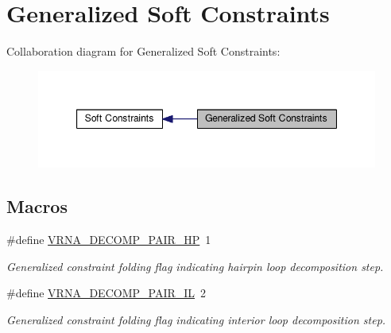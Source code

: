 \hypertarget{group__generalized__sc}{\section{Generalized Soft Constraints}
\label{group__generalized__sc}
}
Collaboration diagram for Generalized Soft Constraints\+:
\nopagebreak
\begin{figure}[H]
\begin{center}
\leavevmode
\includegraphics[width=347pt]{group__generalized__sc}
\end{center}
\end{figure}
\subsection*{Macros}
\begin{DoxyCompactItemize}
\item 
\hypertarget{group__generalized__sc_ga8bd41ebc8039378d242e4e8c273716a5}{\#define \hyperlink{group__generalized__sc_ga8bd41ebc8039378d242e4e8c273716a5}{V\+R\+N\+A\+\_\+\+D\+E\+C\+O\+M\+P\+\_\+\+P\+A\+I\+R\+\_\+\+H\+P}~1}\label{group__generalized__sc_ga8bd41ebc8039378d242e4e8c273716a5}

\begin{DoxyCompactList}\small\item\em Generalized constraint folding flag indicating hairpin loop decomposition step. \end{DoxyCompactList}\item 
\hypertarget{group__generalized__sc_gaeab04f34d7730cff2d651d782f95d857}{\#define \hyperlink{group__generalized__sc_gaeab04f34d7730cff2d651d782f95d857}{V\+R\+N\+A\+\_\+\+D\+E\+C\+O\+M\+P\+\_\+\+P\+A\+I\+R\+\_\+\+I\+L}~2}\label{group__generalized__sc_gaeab04f34d7730cff2d651d782f95d857}

\begin{DoxyCompactList}\small\item\em Generalized constraint folding flag indicating interior loop decomposition step. \end{DoxyCompactList}\end{DoxyCompactItemize}
